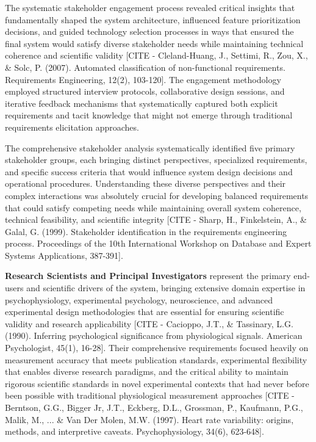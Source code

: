 \documentclass[11pt,a4paper]{report}
\begin{document}
The systematic stakeholder engagement process revealed critical insights that fundamentally shaped the system
architecture, influenced feature prioritization decisions, and guided technology selection processes in ways that
ensured the final system would satisfy diverse stakeholder needs while maintaining technical coherence and scientific
validity [CITE - Cleland-Huang, J., Settimi, R., Zou, X., \& Solc, P. (2007). Automated classification of non-functional requirements. Requirements Engineering, 12(2), 103-120].
The engagement methodology employed structured interview protocols, collaborative design sessions, and iterative
feedback mechanisms that systematically captured both explicit requirements and tacit knowledge that might not emerge
through traditional requirements elicitation approaches.

The comprehensive stakeholder analysis systematically identified five primary stakeholder groups, each bringing distinct
perspectives, specialized requirements, and specific success criteria that would influence system design decisions and
operational procedures. Understanding these diverse perspectives and their complex interactions was absolutely crucial
for developing balanced requirements that could satisfy competing needs while maintaining overall system coherence,
technical feasibility, and scientific
integrity [CITE - Sharp, H., Finkelstein, A., \& Galal, G. (1999). Stakeholder identification in the requirements engineering process. Proceedings of the 10th International Workshop on Database and Expert Systems Applications, 387-391].

\textbf{Research Scientists and Principal Investigators} represent the primary end-users and scientific drivers of the
system, bringing extensive domain expertise in psychophysiology, experimental psychology, neuroscience, and advanced
experimental design methodologies that are essential for ensuring scientific validity and research
applicability [CITE - Cacioppo, J.T., \& Tassinary, L.G. (1990). Inferring psychological significance from physiological signals. American Psychologist, 45(1), 16-28].
Their comprehensive requirements focused heavily on measurement accuracy that meets publication standards, experimental
flexibility that enables diverse research paradigms, and the critical ability to maintain rigorous scientific standards
in novel experimental contexts that had never before been possible with traditional physiological measurement
approaches [CITE - Berntson, G.G., Bigger Jr, J.T., Eckberg, D.L., Grossman, P., Kaufmann, P.G., Malik, M., ... \& Van Der Molen, M.W. (1997). Heart rate variability: origins, methods, and interpretive caveats. Psychophysiology, 34(6), 623-648].
\end{document}
